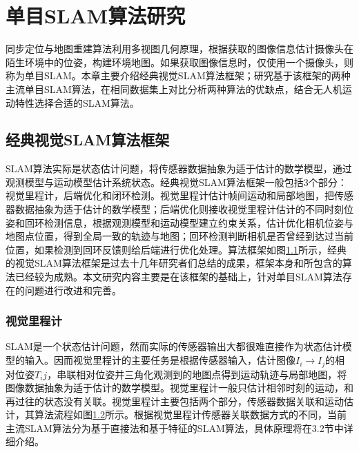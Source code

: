 
\chapter{单目SLAM算法研究}
\label{chap:ALGORITHM}

同步定位与地图重建算法利用多视图几何原理\upcite{[]}，根据获取的图像信息估计摄像头在陌生环境中的位姿，构建环境地图。如果获取图像信息时，仅使用一个摄像头，则称为单目SLAM。本章主要介绍经典视觉SLAM算法框架；研究基于该框架的两种主流单目SLAM算法，在相同数据集上对比分析两种算法的优缺点，结合无人机运动特性选择合适的SLAM算法。

\section{经典视觉SLAM算法框架}
SLAM算法实际是状态估计问题，将传感器数据抽象为适于估计的数学模型，通过观测模型与运动模型估计系统状态。经典视觉SLAM算法框架一般包括3个部分：视觉里程计，后端优化和闭环检测。视觉里程计估计帧间运动和局部地图，把传感器数据抽象为适于估计的数学模型；后端优化则接收视觉里程计估计的不同时刻位姿和回环检测信息，根据观测模型和运动模型建立约束关系，估计优化相机位姿与地图点位置，得到全局一致的轨迹与地图；回环检测判断相机是否曾经到达过当前位置，如果检测到回环反馈则给后端进行优化处理。算法框架如图\ref{fig3.1}所示，经典的视觉SLAM算法框架是过去十几年研究者们总结的成果，框架本身和所包含的算法已经较为成熟。本文研究内容主要是在该框架的基础上，针对单目SLAM算法存在的问题进行改进和完善。
\begin{figure}
\label{fig3.1}

\end{figure}
\subsection{视觉里程计}
SLAM是一个状态估计问题，然而实际的传感器输出大都很难直接作为状态估计模型的输入。因而视觉里程计的主要任务是根据传感器输入，估计图像$I_i \rightarrow I_j$的相对位姿$T_ij$，串联相对位姿并三角化观测到的地图点得到运动轨迹与局部地图，将图像数据抽象为适于估计的数学模型。视觉里程计一般只估计相邻时刻的运动，和再过往的状态没有关联。视觉里程计主要包括两个部分，传感器数据关联和运动估计，其算法流程如图\ref{fig3.2}所示。根据视觉里程计传感器关联数据方式的不同，当前主流SLAM算法分为基于直接法和基于特征的SLAM算法，具体原理将在3.2节中详细介绍。
\begin{figure}
\label{fig3.2}

\end{figure}

